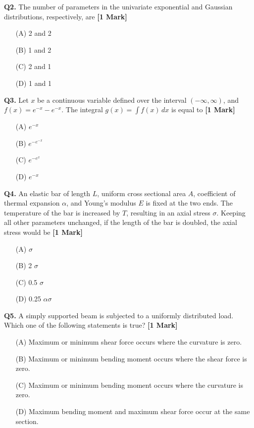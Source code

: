 \documentclass[11pt]{article}
\newcommand{\questiona}[2]{
    \noindent\textbf{Q#2.} #1 \hfill \textbf{[1 Mark]}
}
\begin{document}
\vspace{0.5cm}

\questiona{The number of parameters in the univariate exponential and Gaussian distributions, respectively, are}{2}
\begin{enumerate}
    \item[(A)] 2 and 2
    \item[(B)] 1 and 2
    \item[(C)] 2 and 1
    \item[(D)] 1 and 1
\end{enumerate}

\vspace{0.5cm}

\questiona{Let \( x \) be a continuous variable defined over the interval \((-\infty, \infty)\), and \( f(x) = e^{-x} - e^{-x} \). The integral \( g(x) = \int f(x) \, dx \) is equal to}{3}
\begin{enumerate}
    \item[(A)] \( e^{-x} \)
    \item[(B)] \( e^{-e^{-x}} \)
    \item[(C)] \( e^{-e^x} \)
    \item[(D)] \( e^{-x} \)
\end{enumerate}

\vspace{0.5cm}

\questiona{An elastic bar of length \( L \), uniform cross sectional area \( A \), coefficient of thermal expansion \( \alpha \), and Young's modulus \( E \) is fixed at the two ends. The temperature of the bar is increased by \( T \), resulting in an axial stress \( \sigma \). Keeping all other parameters unchanged, if the length of the bar is doubled, the axial stress would be}{4}
\begin{enumerate}
    \item[(A)] \( \sigma \)
    \item[(B)] 2 \( \sigma \)
    \item[(C)] 0.5 \( \sigma \)
    \item[(D)] 0.25 \( \alpha \sigma \)
\end{enumerate}

\vspace{0.5cm}

\questiona{A simply supported beam is subjected to a uniformly distributed load. Which one of the following statements is true?}{5}
\begin{enumerate}
    \item[(A)] Maximum or minimum shear force occurs where the curvature is zero.
    \item[(B)] Maximum or minimum bending moment occurs where the shear force is zero.
    \item[(C)] Maximum or minimum bending moment occurs where the curvature is zero.
    \item[(D)] Maximum bending moment and maximum shear force occur at the same section.
\end{enumerate}
\end{document}
